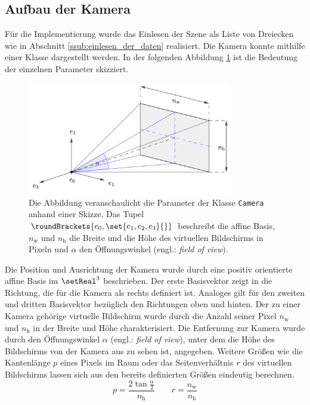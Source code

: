 \documentclass[crop=false]{standalone}
\begin{document}
    \subsection{Aufbau der Kamera} %
    \label{sub:aufbau_der_kamera}
      Für die Implementierung wurde das Einlesen der Szene als Liste von Dreiecken wie in Abschnitt \ref{ssub:einlesen_der_daten} realisiert.
      Die Kamera konnte mithilfe einer Klasse dargestellt werden.
      In der folgenden Abbildung \ref{fig:camera-scheme} ist die Bedeutung der einzelnen Parameter skizziert.
      \begin{figure}[h]
        \center
        \includegraphics[width=0.8\textwidth]{images/camera_scheme.pdf}
        \caption{%
          Die Abbildung veranschaulicht die Parameter der Klasse \texttt{Camera} anhand einer Skizze.
          Das Tupel $\roundBrackets{e_0,\set{e_1,e_2,e_3}{}}$ beschreibt die affine Basis, $n_\mathrm{w}$ und $n_\mathrm{h}$ die Breite und die Höhe des virtuellen Bildschirms in Pixeln und $α$ den Öffnungswinkel (engl.: \textit{field of view}).
        }
        \label{fig:camera-scheme}
      \end{figure}
      Die Position und Ausrichtung der Kamera wurde durch eine positiv orientierte affine Basis im $\setReal^3$ beschrieben.
      Der erste Basisvektor zeigt in die Richtung, die für die Kamera als rechts definiert ist.
      Analoges gilt für den zweiten und dritten Basisvektor bezüglich den Richtungen oben und hinten.
      Der zu einer Kamera gehörige virtuelle Bildschirm wurde durch die Anzahl seiner Pixel $n_\mathrm{w}$ und $n_\mathrm{h}$ in der Breite und Höhe charakterisiert.
      Die Entfernung zur Kamera wurde durch den Öffnungswinkel $\alpha$ (engl.: \textit{field of view}), unter dem die Höhe des Bildschirms von der Kamera aus zu sehen ist, angegeben.
      Weitere Größen wie die Kantenlänge $p$ eines Pixels im Raum oder das Seitenverhältnis $r$ des virtuellen Bildschirms lassen sich aus den bereits definierten Größen eindeutig berechnen.
      \[
        p = \frac{2\tan \frac{\alpha}{2}}{n_\mathrm{h}}
        \qquad
        r = \frac{n_\mathrm{w}}{n_\mathrm{h}}
      \]
\end{document}
